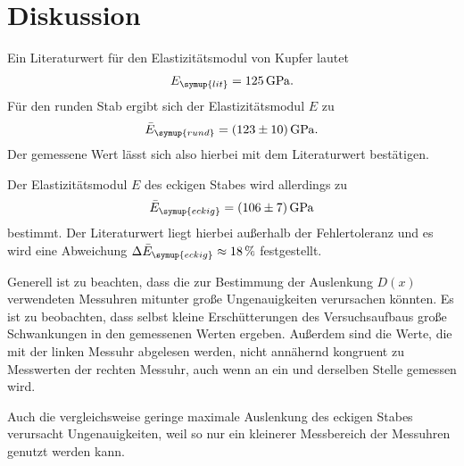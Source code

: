 \section{Diskussion}
\label{sec:Diskussion}
Ein Literaturwert \cite[S. 829 / E77]{czichos} für den Elastizitätsmodul von Kupfer lautet
\begin{gather}
    E_{\symup{lit}} = \qty{125}{\giga\pascal}. \notag
\end{gather}
Für den runden Stab ergibt sich der Elastizitätsmodul $E$ zu
\begin{gather}
    \bar{E}_{\symup{rund}} = \qty{123+-10}{\giga\pascal}. \notag
\end{gather}
Der gemessene Wert lässt sich also hierbei mit dem Literaturwert bestätigen.

Der Elastizitätsmodul $E$ des eckigen Stabes wird allerdings zu 
\begin{gather}
    \bar{E}_{\symup{eckig}} = \qty{106+-7}{\giga\pascal} \notag
\end{gather}
bestimmt. Der Literaturwert liegt hierbei außerhalb der Fehlertoleranz und es wird eine Abweichung 
$\Delta \bar{E}_{\symup{eckig}} \approx \qty{18}\percent$ festgestellt.

Generell ist zu beachten, dass die zur Bestimmung der Auslenkung $D(x)$ verwendeten Messuhren mitunter große Ungenauigkeiten
verursachen könnten. Es ist zu beobachten, dass selbst kleine Erschütterungen des Versuchsaufbaus große Schwankungen in den gemessenen Werten ergeben.
Außerdem sind die Werte, die mit der linken Messuhr abgelesen werden, nicht annähernd kongruent zu Messwerten der rechten Messuhr, 
auch wenn an ein und derselben Stelle gemessen wird.

Auch die vergleichsweise geringe maximale Auslenkung des eckigen Stabes verursacht Ungenauigkeiten, weil so nur ein kleinerer
Messbereich der Messuhren genutzt werden kann.

